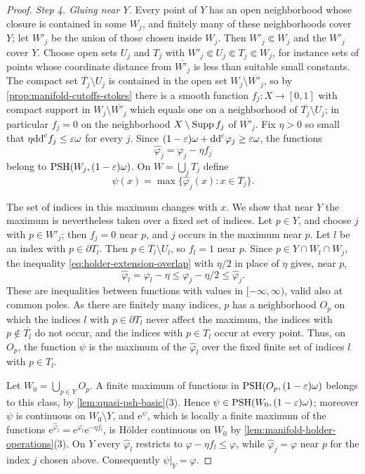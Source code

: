 \begin{proof}
\emph{Step 4. Gluing near $Y$.} Every point of $Y$ has an open neighborhood whose closure is contained in some $W_j$, and finitely many of these neighborhoods cover $Y$; let $W'_j$ be the union of those chosen inside $W_j$. Then $W'_j\Subset W_j$ and the $W'_j$ cover $Y$. Choose open sets $U_j$ and $T_j$ with $W'_j\Subset U_j\Subset T_j\Subset W_j$, for instance sets of points whose coordinate distance from $\overline{W'_j}$ is less than suitable small constants. The compact set $\overline{T_j}\setminus U_j$ is contained in the open set $W_j\setminus\overline{W'_j}$, so by \cref{prop:manifold-cutoffs-stokes} there is a smooth function $f_j\colon X\to[0,1]$ with compact support in $W_j\setminus\overline{W'_j}$ which equals one on a neighborhood of $\overline{T_j}\setminus U_j$; in particular $f_j=0$ on the neighborhood $X\setminus\operatorname{Supp} f_j$ of $\overline{W'_j}$. Fix $\eta>0$ so small that $\eta\mathrm{dd}^{\mathrm{c}} f_j\leq\varepsilon\omega$ for every $j$. Since $(1-\varepsilon)\omega+\mathrm{dd}^{\mathrm{c}}\varphi_j\geq\varepsilon\omega$, the functions
\[
 \widehat\varphi_j=\varphi_j-\eta f_j
\]
belong to $\mathrm{PSH}(W_j,(1-\varepsilon)\omega)$. On $W=\bigcup_jT_j$ define
\[
 \psi(x)=\max\{\widehat\varphi_j(x):x\in T_j\}.
\]

The set of indices in this maximum changes with $x$. We show that near $Y$ the maximum is nevertheless taken over a fixed set of indices. Let $p\in Y$, and choose $j$ with $p\in W'_j$; then $f_j=0$ near $p$, and $j$ occurs in the maximum near $p$. Let $l$ be an index with $p\in\partial T_l$. Then $p\in\overline{T_l}\setminus U_l$, so $f_l=1$ near $p$. Since $p\in Y\cap W_l\cap W_j$, the inequality \eqref{eq:holder-extension-overlap} with $\eta/2$ in place of $\eta$ gives, near $p$,
\[
 \widehat\varphi_l=\varphi_l-\eta\leq\varphi_j-\eta/2\leq\widehat\varphi_j.
\]
These are inequalities between functions with values in $[-\infty,\infty)$, valid also at common poles. As there are finitely many indices, $p$ has a neighborhood $O_p$ on which the indices $l$ with $p\in\partial T_l$ never affect the maximum, the indices with $p\notin\overline{T_l}$ do not occur, and the indices with $p\in T_l$ occur at every point. Thus, on $O_p$, the function $\psi$ is the maximum of the $\widehat\varphi_l$ over the fixed finite set of indices $l$ with $p\in T_l$.

Let $W_0=\bigcup_{p\in Y}O_p$. A finite maximum of functions in $\mathrm{PSH}(O_p,(1-\varepsilon)\omega)$ belongs to this class, by \cref{lem:quasi-psh-basic}(3). Hence $\psi\in\mathrm{PSH}(W_0,(1-\varepsilon)\omega)$; moreover $\psi$ is continuous on $W_0\setminus Y$, and $\mathrm e^\psi$, which is locally a finite maximum of the functions $\mathrm e^{\widehat\varphi_l}=\mathrm e^{\varphi_l}\mathrm e^{-\eta f_l}$, is H\"older continuous on $W_0$ by \cref{lem:manifold-holder-operations}(3). On $Y$ every $\widehat\varphi_l$ restricts to $\varphi-\eta f_l\leq\varphi$, while $\widehat\varphi_j=\varphi$ near $p$ for the index $j$ chosen above. Consequently $\psi|_Y=\varphi$.


\end{proof}
